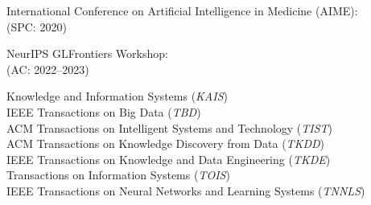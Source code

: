\documentclass[10pt]{article}
\newenvironment{myindentpar}[1]%
{\begin{list}{}%
         {\setlength{\leftmargin}{#1}}%
         \item[]%
}
{\end{list}}
\newcounter{list}
\begin{document}
\begin{myindentpar}{0.75cm}
{International Conference on Artificial Intelligence in Medicine (AIME): \\
(SPC: 2020)

NeurIPS GLFrontiers Workshop: \\
(AC: 2022--2023)

}


\hspace{-0.75cm}{\bf Journal Reviewer}

{\small

Knowledge and Information Systems (\textit{KAIS}) \\
IEEE Transactions on Big Data (\textit{TBD}) \\
ACM Transactions on Intelligent Systems and Technology (\textit{TIST}) \\
ACM Transactions on Knowledge Discovery from Data (\textit{TKDD}) \\
IEEE Transactions on Knowledge and Data Engineering (\textit{TKDE}) \\
Transactions on Information Systems (\textit{TOIS}) \\
IEEE Transactions on Neural Networks and Learning Systems (\textit{TNNLS})

}
\end{myindentpar}
\end{document}
